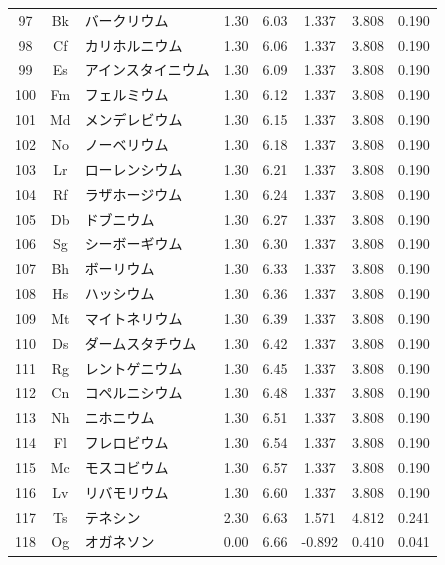 \documentclass[11pt,a4paper]{article}
\begin{document}
\begin{longtable}{|c|c|p{2.5cm}|c|c|c|c|c|}
			97 & Bk & バークリウム & 1.30 & 6.03 & 1.337 & 3.808 & 0.190 \\
			98 & Cf & カリホルニウム & 1.30 & 6.06 & 1.337 & 3.808 & 0.190 \\
			99 & Es & アインスタイニウム & 1.30 & 6.09 & 1.337 & 3.808 & 0.190 \\
			100 & Fm & フェルミウム & 1.30 & 6.12 & 1.337 & 3.808 & 0.190 \\
			101 & Md & メンデレビウム & 1.30 & 6.15 & 1.337 & 3.808 & 0.190 \\
			102 & No & ノーベリウム & 1.30 & 6.18 & 1.337 & 3.808 & 0.190 \\
			103 & Lr & ローレンシウム & 1.30 & 6.21 & 1.337 & 3.808 & 0.190 \\
			104 & Rf & ラザホージウム & 1.30 & 6.24 & 1.337 & 3.808 & 0.190 \\
			105 & Db & ドブニウム & 1.30 & 6.27 & 1.337 & 3.808 & 0.190 \\
			106 & Sg & シーボーギウム & 1.30 & 6.30 & 1.337 & 3.808 & 0.190 \\
			107 & Bh & ボーリウム & 1.30 & 6.33 & 1.337 & 3.808 & 0.190 \\
			108 & Hs & ハッシウム & 1.30 & 6.36 & 1.337 & 3.808 & 0.190 \\
			109 & Mt & マイトネリウム & 1.30 & 6.39 & 1.337 & 3.808 & 0.190 \\
			110 & Ds & ダームスタチウム & 1.30 & 6.42 & 1.337 & 3.808 & 0.190 \\
			111 & Rg & レントゲニウム & 1.30 & 6.45 & 1.337 & 3.808 & 0.190 \\
			112 & Cn & コペルニシウム & 1.30 & 6.48 & 1.337 & 3.808 & 0.190 \\
			113 & Nh & ニホニウム & 1.30 & 6.51 & 1.337 & 3.808 & 0.190 \\
			114 & Fl & フレロビウム & 1.30 & 6.54 & 1.337 & 3.808 & 0.190 \\
			115 & Mc & モスコビウム & 1.30 & 6.57 & 1.337 & 3.808 & 0.190 \\
			116 & Lv & リバモリウム & 1.30 & 6.60 & 1.337 & 3.808 & 0.190 \\
			117 & Ts & テネシン & 2.30 & 6.63 & 1.571 & 4.812 & 0.241 \\
			118 & Og & オガネソン & 0.00 & 6.66 & -0.892 & 0.410 & 0.041 \\
			\hline
		\end{longtable}
	
	
\end{document}
